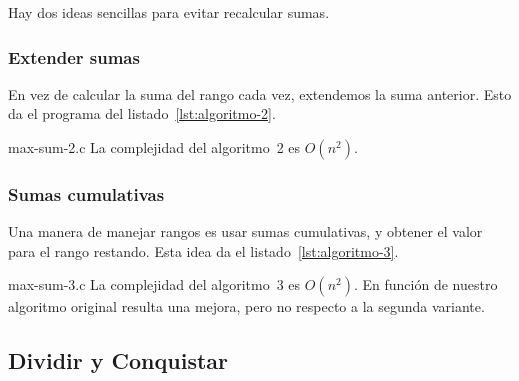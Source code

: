 \documentclass[english, spanish, fleqn, 10pt]{article}
\numberwithin{equation}{section}
\newcommand{\nparentesis}[1]{\left( #1 \right)}
\theoremstyle{definition}
\begin{document}
  Hay dos ideas sencillas para evitar recalcular sumas.

\subsubsection{Extender sumas}
\label{sec:algoritmo-2}

  En vez de calcular la suma del rango cada vez,
  extendemos la suma anterior.
  Esto da el programa del listado~\ref{lst:algoritmo-2}.
  
                  {max-sum-2.c}
La complejidad del algoritmo~2 es $O\nparentesis{n^2}$.

\subsubsection{Sumas cumulativas}
\label{sec:algoritmo-3}

  Una manera de manejar rangos es usar sumas cumulativas,
  y obtener el valor para el rango restando.
  Esta idea da el listado~\ref{lst:algoritmo-3}.
  
                  {max-sum-3.c}
La complejidad del algoritmo~3 es $O\nparentesis{n^2}$. En función de nuestro algoritmo original resulta una mejora, pero no respecto a la segunda variante.

\subsection{Dividir y Conquistar}
\label{sec:algoritmo-4}
\end{document}
